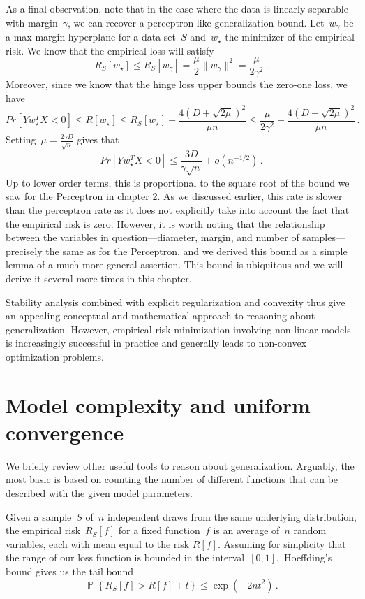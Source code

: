 \documentclass{tufte-book}
\begin{document}
As a final observation, note that in the case where the data is linearly
separable with margin~\(\gamma\), we can recover a perceptron-like
generalization bound. Let~\(w_\gamma\) be a max-margin hyperplane for a
data set~\(S\) and~\(w_\star\) the minimizer of the empirical risk. We
know that the empirical loss will satisfy \[
R_S[w_\star] \leq R_S[w_\gamma] = \frac{\mu}{2} \| w_\gamma \|^2 = \frac{\mu }{2\gamma^2}\,.
\] Moreover, since we know that the hinge loss upper bounds the zero-one
loss, we have \[
Pr[Y w_\star^T X < 0] \leq R[w_\star] \leq R_S[w_\star] + \frac{4(D+\sqrt{2\mu})^2}{\mu n} \leq \frac{\mu }{2\gamma^2} +  \frac{4(D+\sqrt{2\mu})^2}{\mu n}\,.
\] Setting~\(\mu=\frac{2\gamma D}{\sqrt{n}}\) gives that \[
  Pr[Y w_\star^T X < 0] \leq \frac{ 3 D }{\gamma \sqrt{n}} + o(n^{-1/2})\,.
\] Up to lower order terms, this is proportional to the square root of
the bound we saw for the Perceptron in chapter 2. As we discussed
earlier, this rate is slower than the perceptron rate as it does not
explicitly take into account the fact that the empirical risk is zero.
However, it is worth noting that the relationship between the variables
in question---diameter, margin, and number of samples---precisely the
same as for the Perceptron, and we derived this bound as a simple lemma
of a much more general assertion. This bound is ubiquitous and we will
derive it several more times in this chapter.

Stability analysis combined with explicit regularization and convexity
thus give an appealing conceptual and mathematical approach to reasoning
about generalization. However, empirical risk minimization involving
non-linear models is increasingly successful in practice and generally
leads to non-convex optimization problems.

\hypertarget{model-complexity-and-uniform-convergence}{%
\section{Model complexity and uniform
convergence}\label{model-complexity-and-uniform-convergence}}


We briefly review other useful tools to reason about generalization.
Arguably, the most basic is based on counting the number of different
functions that can be described with the given model parameters.

Given a sample~\(S\) of~\(n\) independent draws from the same underlying
distribution, the empirical risk~\(R_S[f]\) for a fixed function~\(f\)
is an average of~\(n\) random variables, each with mean equal to the
risk \(R[f]\). Assuming for simplicity that the range of our loss
function is bounded in the interval~\([0,1],\) Hoeffding's bound gives
us the tail bound \[
\mathop\mathbb{P}\left\{ R_S[f] > R[f] + t\right\} \le \exp(-2nt^2)\,.
\]
\end{document}
